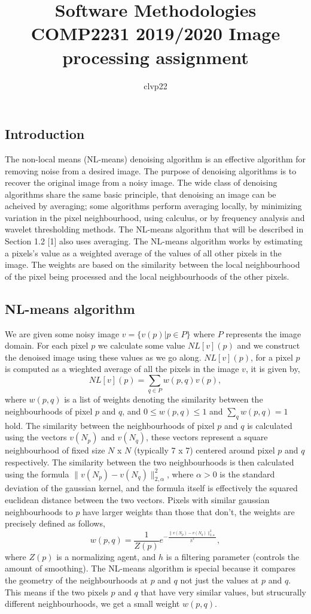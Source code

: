 \documentclass[11pt, twocolumn]{article}
\title{Software Methodologies COMP2231 2019/2020 Image processing assignment}
\author{clvp22} %
\begin{document}
\maketitle
\section{}
\subsection{Introduction}
The non-local means (NL-means) denoising algorithm is an effective algorithm for removing noise from a desired image. The purpose of denoising algorithms is to recover the original image from a noisy image. The wide class of denoising algorithms share the same basic principle, that denoising an image can be acheived by averaging; some algorithms perform averaging locally, by minimizing variation in the pixel neighbourhood, using calculus, or by frequency analysis and wavelet thresholding methods. The NL-means algorithm that will be described in Section 1.2 [1] also uses averaging. The NL-means algorithm works by estimating a pixels's value as a weighted average of the values of all other pixels in the image. The weights are based on the similarity between the local neighbourhood of the pixel being processed and the local neighbourhoods of the other pixels.
\subsection{NL-means algorithm}
We are given some noisy image $v = \{v(p) | p \in P\}$ where $P$ represents the image domain. For each pixel $p$ we calculate some value $NL[v](p)$ and we construct the denoised image using these values as we go along. $NL[v](p)$, for a pixel $p$ is computed as a wieghted average of all the pixels in the image $v$, it is given by,
$$NL[v](p) = \sum_{q \in P} w(p,q)v(p),$$
where $w(p,q)$ is a list of weights denoting the similarity between the neighbourhoods of pixel $p$ and $q$, and $0 \le w(p,q) \le 1$ and $\sum_{q}w(p,q) = 1$ hold. The similarity between the neighbourhoods of pixel $p$ and $q$ is calculated using the vectors $v(N_{p})$ and $v(N_{q})$, these vectors represent a square neighbourhood of fixed size $N$ x $N$ (typically 7 x 7) centered around pixel $p$ and $q$ respectively. The similarity between the two neighbourhoods is then calculated using the formula $\parallel v(N_{p}) - v(N_{q}) \parallel_{2, \alpha}^{2}$, where $\alpha > 0$ is the standard deviation of the gaussian kernel, and the formula itself is effectively the squared euclidean distance between the two vectors. Pixels with similar gaussian neighbourhoods to $p$ have larger weights than those that don't, the weights are precisely defined as follows,
$$w(p,q) = \frac{1}{Z(p)} e^{-\frac{\parallel v(N_{p}) - v(N_{q}) \parallel_{2, \alpha}^{2}}{h^2}},$$
where $Z(p)$ is a normalizing agent, and $h$ is a filtering parameter (controls the amount of smoothing). The NL-means algorithm is special because it compares the geometry of the neighbourhoods at $p$ and $q$ not just the values at $p$ and $q$. This means if the two pixels $p$ and $q$ that have very similar values, but strucurally different neighbourhoods, we get a small weight $w(p,q)$.
\end{document}
